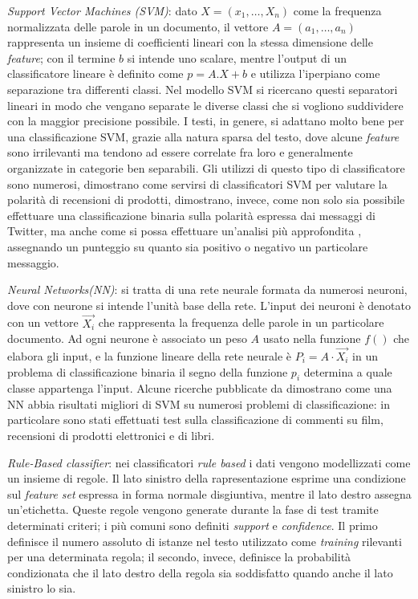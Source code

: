 \documentclass[a4paper,12pt,openright,twoside]{report}
\theoremstyle{definition}
\begin{document}
\emph{Support Vector Machines (SVM)}: dato $X=(x_1,\dots, X_n)$ come la frequenza normalizzata delle parole
in un documento, il vettore $A=(a_1,\dots,a_n)$ rappresenta un insieme di coefficienti lineari con la
stessa dimensione delle \emph{feature}; con il termine $b$ si intende uno scalare, 
mentre l'output di un classificatore
lineare è definito come $p=A.X + b$ e utilizza l'iperpiano come separazione tra differenti classi.
Nel modello SVM si ricercano questi separatori lineari in modo che vengano separate le diverse classi che si
vogliono suddividere con la maggior precisione possibile.
I testi, in genere, si adattano molto bene per una classificazione SVM, grazie alla natura sparsa del testo, dove
alcune \emph{feature} sono irrilevanti ma tendono ad essere correlate fra loro e generalmente organizzate
in categorie ben separabili.
Gli utilizzi di questo tipo di classificatore sono numerosi, \cite{chen2011}
dimostrano come servirsi di classificatori SVM per valutare la polarità di recensioni di prodotti,
\cite{Hu2011}
dimostrano, invece, come non solo sia possibile effettuare una classificazione binaria sulla polarità espressa
dai messaggi di Twitter, ma anche come si possa effettuare un'analisi più approfondita
, assegnando un punteggio
su quanto sia positivo o negativo un particolare messaggio.

\emph{Neural Networks(NN)}: si tratta di una rete neurale formata da numerosi neuroni, dove con neurone si intende l'unità
base della rete. L'input dei neuroni è denotato con un vettore $\vec{X_i}$ che rappresenta la frequenza
delle parole in un particolare documento. Ad ogni neurone è associato un peso $A$ usato nella funzione $f()$
che elabora gli input, e la funzione lineare della rete neurale è $P_i = A\cdot \vec{X_i}$ in un problema
di classificazione binaria il segno della funzione $p_i$ determina a quale classe appartenga l'input.
Alcune ricerche pubblicate da \cite{Moraes2013}
dimostrano come una NN abbia risultati migliori di SVM su numerosi problemi di classificazione: in particolare
sono stati effettuati test sulla classificazione di commenti su film, recensioni di prodotti elettronici e di libri.

\emph{Rule-Based classifier}: nei classificatori \emph{rule based} i dati vengono modellizzati come un insieme di regole.
Il lato sinistro della rapresentazione esprime una condizione sul \emph{feature set} espressa in forma normale
disgiuntiva, mentre il lato destro assegna un'etichetta.
Queste regole vengono generate durante la fase di test tramite determinati criteri; i più comuni sono
definiti \emph{support} e \emph{confidence}. Il primo definisce il numero assoluto di 
istanze nel testo utilizzato
come \emph{training} rilevanti per una determinata regola; il secondo, invece, definisce la probabilità
condizionata che il lato destro della regola sia soddisfatto quando anche il lato sinistro lo sia.
\end{document}
